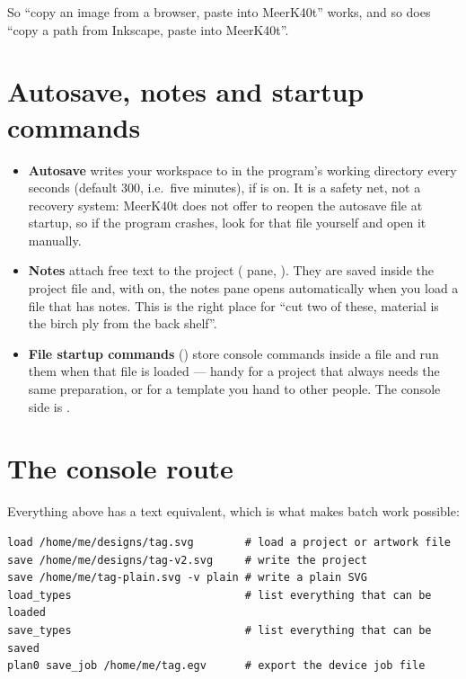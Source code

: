 \noindent So ``copy an image from a browser, paste into MeerK40t'' works, and so
does ``copy a path from Inkscape, paste into MeerK40t''.

\section{Autosave, notes and startup commands}

\begin{itemize}
  \item \textbf{Autosave} writes your workspace to  in the
        program's working directory every
         seconds (default 300, i.e.\ five minutes), if
         is on. It is a safety net, not a recovery
        system: MeerK40t does not offer to reopen the autosave file at startup,
        so if the program crashes, look for that file yourself and open it
        manually.
  \item \textbf{Notes} attach free text to the project ( pane,
        ). They are saved inside the project file and,
        with  on, the notes pane opens automatically when you
        load a file that has notes. This is the right place for ``cut two of
        these, material is the birch ply from the back shelf''.
  \item \textbf{File startup commands} () store console
        commands inside a file and run them when that file is loaded --- handy for
        a project that always needs the same preparation, or for a template you
        hand to other people. The console side is .
\end{itemize}

\section{The console route}

Everything above has a text equivalent, which is what makes batch work possible:

\begin{lstlisting}[style=konsole]
load /home/me/designs/tag.svg        # load a project or artwork file
save /home/me/designs/tag-v2.svg     # write the project
save /home/me/tag-plain.svg -v plain # write a plain SVG
load_types                           # list everything that can be loaded
save_types                           # list everything that can be saved
plan0 save_job /home/me/tag.egv      # export the device job file
\end{lstlisting}

